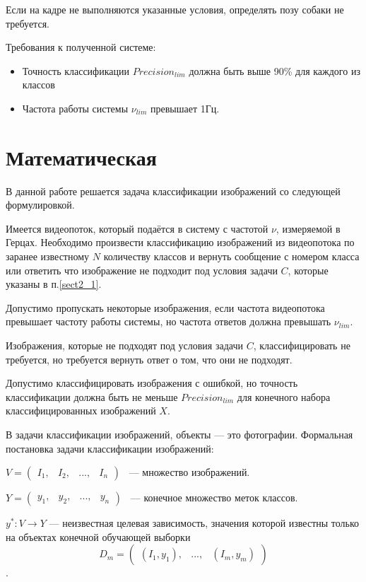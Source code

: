 Если на кадре не выполняются указанные условия, определять позу собаки не требуется.

Требования к полученной системе:
\begin{itemize}
    \item Точность классификации $Precision_{lim}$ должна быть выше 90\% для каждого из классов
    \item Частота работы системы $\nu_{lim}$ превышает 1Гц.
\end{itemize}


\section{Математическая}\label{sect2_2}

В данной работе решается задача классификации изображений со следующей формулировкой. 

Имеется видеопоток, который подаётся в систему с частотой $\nu$, измеряемой в Герцах. Необходимо произвести классификацию изображений из видеопотока по заранее известному $N$ количеству классов и вернуть сообщение с номером класса или ответить что изображение не подходит под условия задачи $C$, которые указаны в п.\ref{sect2_1}. 

Допустимо пропускать некоторые изображения, если частота видеопотока превышает частоту работы системы, но частота ответов должна превышать $\nu_{lim}$. 

Изображения, которые не подходят под условия задачи $C$, классифицировать не требуется, но требуется вернуть ответ о том, что они не подходят. 

Допустимо классифицировать изображения с ошибкой, но точность классификации должна быть не меньше $Precision_{lim}$ для конечного набора классифицированных изображений $X$.

В задачи классификации изображений, объекты — это фотографии. Формальная постановка задачи классификации изображений:

$ V = \begin{pmatrix} 
             I_1, & I_2, & ..., & I_n 
      \end{pmatrix}
$
~— множество изображений. 

$ Y = \begin{pmatrix}
                  y_1, & y_2, & ..., & y_n 
      \end{pmatrix}
$
~— конечное множество меток классов.

$y^{*} : V \rightarrow Y$ — неизвестная целевая зависимость, значения которой известны только на объектах конечной обучающей выборки 
\[ D_m = 
        \begin{pmatrix}
             (I_1, y_1), & ..., & (I_m, y_m)
        \end{pmatrix}
\].


